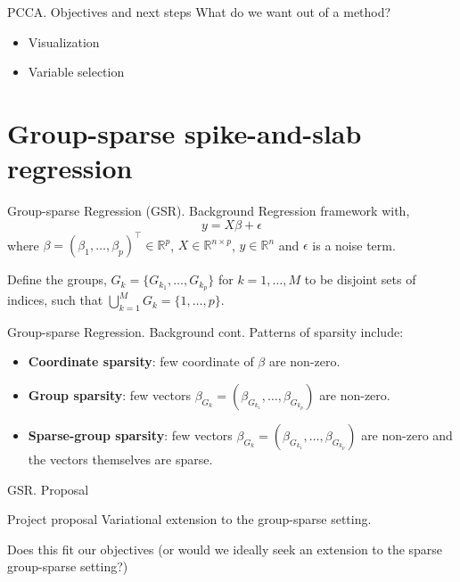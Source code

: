 \documentclass{beamer}
\newcommand{\R}{\mathbb{R}}
\newcommand{\vs}[1]{
    \vspace{#1pt}

}
\begin{document}
\begin{frame}{PCCA. Objectives and next steps}
What do we want out of a method?
\begin{itemize}
    \item Visualization
    \item Variable selection
\end{itemize}
\end{frame}


\section{Group-sparse spike-and-slab regression}
\begin{frame}{Group-sparse Regression (GSR). Background}
Regression framework with,
\begin{equation}
    y = X\beta + \epsilon
\end{equation}
where $\beta = (\beta_1, \dots, \beta_p)^\top \in \R^p$, $X \in \R^{n \times p}$, $y \in \R^{n}$ and $\epsilon$ is a noise term. 
\vs{20}
Define the groups, $G_k = \{ G_{k_1}, \dots, G_{k_p} \}$ for $k=1,\dots,M$ to be disjoint sets of indices, such that $ \bigcup_{k=1}^M G_k = \{1, \dots, p \}$.
\end{frame}

\begin{frame}{Group-sparse Regression. Background cont.}
Patterns of sparsity include:
\vs{4}
\begin{itemize}
    \itemsep8pt
    \item \textbf{Coordinate sparsity}: few coordinate of $\beta$ are non-zero.
    \item \textbf{Group sparsity}: few vectors $\beta_{G_k} = (\beta_{G_{k_1}}, \dots, \beta_{G_{k_p}})$ are non-zero.
    \item \textbf{Sparse-group sparsity}: few vectors $\beta_{G_k} = (\beta_{G_{k_1}}, \dots, \beta_{G_{k_p}})$ are non-zero and the vectors themselves are sparse.
\end{itemize}
\end{frame}

\begin{frame}{GSR. Proposal}
\begin{block}{Project proposal}
    Variational extension to the group-sparse setting.
\end{block}
\vs{10}
Does this fit our objectives (or would we ideally seek an extension to the sparse group-sparse setting?)
\end{frame}
\end{document}
